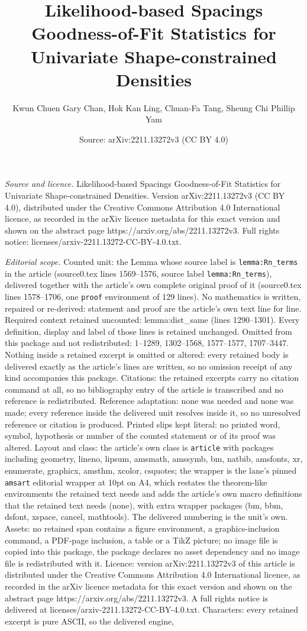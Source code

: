 \documentclass[10pt,a4paper]{amsart}
\title[Likelihood-based Spacings Goodness-of-Fit Statistics for Uni]{Likelihood-based Spacings Goodness-of-Fit Statistics for Univariate Shape-constrained Densities}
\author{Kwun Chuen Gary Chan, Hok Kan Ling, Chuan-Fa Tang, Sheung Chi Phillip Yam}
\date{Source: arXiv:2211.13272v3 (CC BY 4.0)}
\begin{document}
\maketitle

\noindent\emph{Source and licence.} Likelihood-based Spacings Goodness-of-Fit Statistics for Univariate Shape-constrained Densities. Version arXiv:2211.13272v3 (CC BY 4.0), distributed under the Creative Commons Attribution 4.0 International licence, as recorded in the arXiv licence metadata for this exact version and shown on the abstract page https://arxiv.org/abs/2211.13272v3. Full rights notice: licenses/arxiv-2211.13272-CC-BY-4.0.txt.\par\smallskip

\noindent\textit{Editorial scope.} Counted unit: the Lemma whose source label is \texttt{lemma:Rn\_terms} in the article (source0.tex lines 1569--1576, source label \texttt{lemma:Rn\_terms}), delivered together with the article's own complete original proof of it (source0.tex lines 1578--1706, one \texttt{proof} environment of 129 lines). No mathematics is written, repaired or re-derived: statement and proof are the article's own text line for line. Required context retained uncounted: lemma:dist\_same (lines 1290--1301). Every definition, display and label of those lines is retained unchanged. Omitted from this package and not redistributed: 1--1289, 1302--1568, 1577--1577, 1707--3447. Nothing inside a retained excerpt is omitted or altered: every retained body is delivered exactly as the article's lines are written, so no omission receipt of any kind accompanies this package. Citations: the retained excerpts carry no citation command at all, so no bibliography entry of the article is transcribed and no reference is redistributed. Reference adaptation: none was needed and none was made; every reference inside the delivered unit resolves inside it, so no unresolved reference or citation is produced. Printed slips kept literal: no printed word, symbol, hypothesis or number of the counted statement or of its proof was altered. Layout and class: the article's own class is \texttt{article} with packages including geometry, lineno, lipsum, amsmath, amssymb, bm, natbib, amsfonts, xr, enumerate, graphicx, amsthm, xcolor, csquotes; the wrapper is the lane's pinned \texttt{amsart} editorial wrapper at 10pt on A4, which restates the theorem-like environments the retained text needs and adds the article's own macro definitions that the retained text needs (none), with extra wrapper packages (bm, bbm, dsfont, xspace, cancel, mathtools). The delivered numbering is the unit's own. Assets: no retained span contains a figure environment, a graphics-inclusion command, a PDF-page inclusion, a table or a TikZ picture; no image file is copied into this package, the package declares no asset dependency and no image file is redistributed with it. Licence: version arXiv:2211.13272v3 of this article is distributed under the Creative Commons Attribution 4.0 International licence, as recorded in the arXiv licence metadata for this exact version and shown on the abstract page https://arxiv.org/abs/2211.13272v3. A full rights notice is delivered at licenses/arxiv-2211.13272-CC-BY-4.0.txt. Characters: every retained excerpt is pure ASCII, so the delivered engine, 
\end{document}
